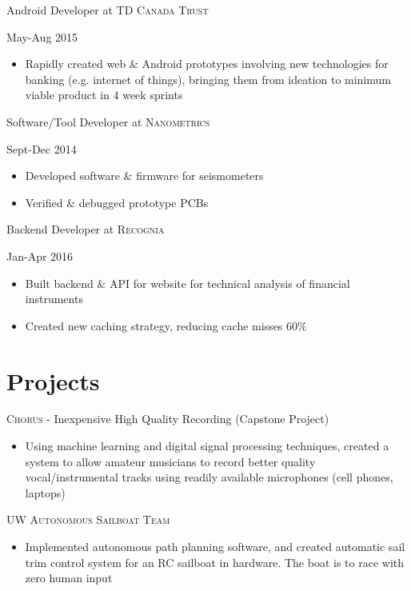 \documentclass[a4paper,10pt]{article}
\begin{document}
\begin{minipage}[t]{0.60\textwidth}
\begin{large}
Android Developer at \textsc{TD Canada Trust}
\end{large}
\hfill  May-Aug 2015
\smallskip
\begin{itemize}
    \item {Rapidly created web \& Android prototypes involving new technologies for banking (e.g. internet of things), bringing them from ideation to minimum viable product in 4 week sprints} %
\end{itemize}
\bigskip

\begin{large}
Software/Tool Developer at \textsc{Nanometrics}
\end{large}
\hfill Sept-Dec 2014
\smallskip
\begin{itemize}
    \item {Developed software \& firmware for seismometers}
    \item {Verified \& debugged prototype PCBs}
\end{itemize}
\bigskip

\begin{large}
Backend Developer at \textsc{Recognia}
\end{large}
\hfill Jan-Apr 2016
\begin{itemize}
    \item{Built backend \& API for website for technical analysis of financial instruments}
    \item{Created new caching strategy, reducing cache misses 60\%}
\end{itemize}

\bigskip

\section{Projects}
\smallskip
\textsc{Chorus} - Inexpensive High Quality Recording (Capstone Project)
\begin{itemize}
	\item {Using machine learning and digital signal processing techniques, created a system to allow amateur musicians to record better quality vocal/instrumental tracks using readily available microphones (cell phones, laptops)}
\end{itemize}

\bigskip

\textsc{UW Autonomous Sailboat Team}
\begin{itemize}
	\item {Implemented autonomous path planning software, and created automatic sail trim control system for an RC sailboat in hardware. The boat is to race with zero human input}
\end{itemize}


\end{minipage}
\end{document}

